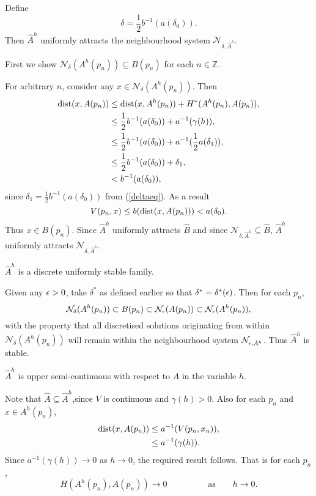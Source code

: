 \begin{lemma}
Define
\[ \delta = \frac{1}{2}b^{-1}(a(\delta_0)). \]
Then $\hat{A}^h$ uniformly attracts the neighbourhood system
$\mathcal{N}_{\delta, \hat{A}^h}$.
\end{lemma}
\begin{prf}
First we show $\mathcal{N}_{\delta}(A^h(p_n)) \subseteq B(p_n)$ for each $n \in
\mathbb{Z}$.

For arbitrary $n$, consider any $x \in \mathcal{N}_{\delta}(A^h(p_n))$.
Then
\begin{align*}
  {\rm dist}(x, A(p_n)) &\leq {\rm dist}(x, A^h(p_n)) + H^*(A^h(p_n), A(p_n)), \\
  &\leq \frac{1}{2} b^{-1}(a(\delta_0)) + a^{-1}(\gamma(h)), \\
  &\leq \frac{1}{2} b^{-1}(a(\delta_0)) + a^{-1}(\frac{1}{2}a(\delta_1)), \\
  &\leq \frac{1}{2} b^{-1}(a(\delta_0)) + \delta_1, \\
  &< b^{-1}(a(\delta_0)), \\
\end{align*}
 since $\delta_1 = \frac{1}{2}b^{-1}(a(\delta_0))$ from (\ref{deltaeq}).
As a result
\[ V(p_n, x) \leq b( {\rm dist}(x, A(p_n)) ) < a( \delta_0 ). \]
Thus $x \in B(p_n)$. Since $\hat{A}^h$ uniformly attracts $\hat{B}$ and since
$\mathcal{N}_{\delta, \hat{A}^h} \subseteq \hat{B}$, $\hat{A}^h$ uniformly
attracts $\mathcal{N}_{\delta, \hat{A}^h}$.
\end{prf}

\begin{lemma}[A6 - Stability]
$\hat{A}^h$ is a discrete uniformly stable family.
\end{lemma}
\begin{prf}
Given any $\epsilon > 0$, take $\delta^*$ as defined earlier so
that $\delta^* = \delta^*(\epsilon)$. Then for each $p_n$,
\[ \mathcal{N}_{\delta}(A^h(p_n)) \subset B(p_n) \subset
  \mathcal{N}_{\epsilon}(A(p_n)) \subset \mathcal{N}_{\epsilon}(A^h(p_n)), \]
with the property that all discretised solutions originating from within
$\mathcal{N}_{\delta}(A^h(p_n))$ will remain within the neighbourhood system
$\mathcal{N}_{\epsilon, \hat{A}^h}$. Thus $\hat{A}^h$ is stable.
\end{prf}

\begin{lemma}[A7]
$\hat{A}^h$ is upper semi-continuous with respect to $\hat{A}$ in the variable
$h$.
\end{lemma}
\begin{prf}
Note that $\hat{A} \subseteq \hat{A}^h$,since $V$ is continuous
and $\gamma(h)>0$. Also for each $p_n$ and $x \in A^h(p_n)$,
\begin{align*}
  {\rm dist}(x, A(p_n)) &\leq a^{-1} (V(p_n, x_n)), \\
  &\leq a^{-1}(\gamma(h)). \\
\end{align*}
Since $a^{-1}(\gamma(h)) \to 0$ as $h \to 0$, the required result follows. That
is for each $p_n$,
\[ H( A^h(p_n), A(p_n)) \to 0 \hspace{2cm} \text{as} \qquad h \to 0. \]
\end{prf}

